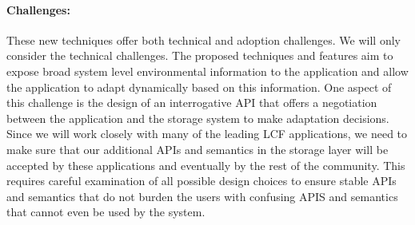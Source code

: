 %

\paragraph{Challenges:}
These new techniques offer both technical and adoption challenges. We will only
consider the technical challenges. The proposed techniques and features aim to
expose broad system level environmental information to the application and
allow the application to adapt dynamically based on this information.  One
aspect of this challenge is the design of an interrogative API that offers a
negotiation between the application and the storage system to make adaptation
decisions.  Since we will work closely with many of the leading LCF
applications, we need to make sure that our additional APIs and semantics in
the storage layer will be accepted by these applications and eventually by the
rest of the community. This requires careful examination of all possible
design choices to ensure stable APIs and semantics that do not burden the users
with confusing APIS and semantics that cannot even be used by the system.


